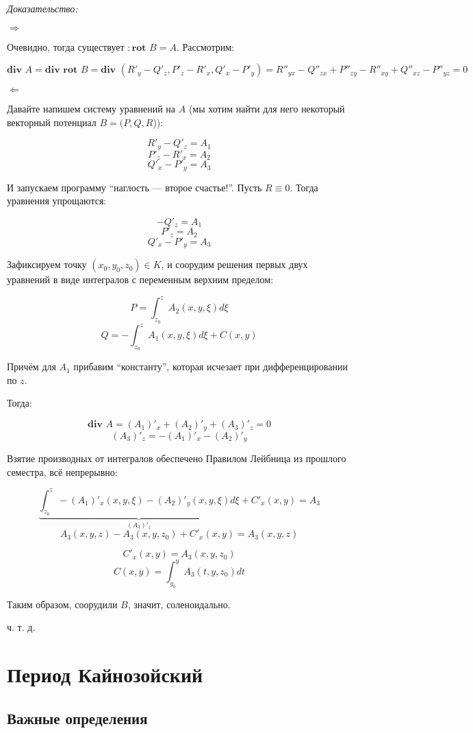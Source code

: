 \documentclass{article}
\begin{document}
\textit{Доказательство:}

$\Rightarrow$

Очевидно, тогда существует $: \textbf{rot } B = A$. Рассмотрим:

\[\textbf{div }A = \textbf{div rot }B = \textbf{div } (R'_y - Q'_z, P'_z - R'_x, Q'_x - P'_y) = R''_{yx} - Q''_{zx} + P''_{zy} - R''_{xy} + Q''_{xz} - P''_{yz} = 0\]

$\Leftarrow$ 

Давайте напишем систему уравнений на $A$ (мы хотим найти для него некоторый векторный потенциал $B = (P, Q, R$)):

\[R'_y - Q'_z = A_1\]
\[P'_z - R'_x = A_2\]
\[Q'_x - P'_y = A_3\]

И запускаем программу ``наглость --- второе счастье!''. Пусть $R \equiv 0$. Тогда уравнения упрощаются:

\[- Q'_z = A_1\]
\[P'_z= A_2\]
\[Q'_x - P'_y = A_3\]

Зафиксируем точку $(x_0, y_0, z_0) \in K$, и соорудим решения первых двух уравнений в виде интегралов с переменным верхним пределом:

\[P = \int_{z_0}^{z} A_2(x, y, \xi) d\xi\]
\[Q = - \int_{z_0}^{z} A_1(x, y, \xi) d\xi + C(x, y)\]

Причём для $A_1$ прибавим ``константу'', которая исчезает при дифференцировании по $z$.

Тогда:

\[\textbf{div } A = (A_1)'_x + (A_2)'_y + (A_3)'_z = 0\]
\[ (A_3)'_z  = - (A_1)'_x - (A_2)'_y\]

Взятие производных от интегралов обеспечено Правилом Лейбница из прошлого семестра, всё непрерывно:

\[\underbrace{\int_{z_0}^{z} -(A_1)'_x(x, y, \xi) - (A_2)'_y(x, y, \xi) d\xi}_{(A_3)'_z} + C'_x(x, y) = A_3\]
\[A_3(x, y, z) - A_3(x, y, z_0) + C'_x(x, y) = A_3(x, y, z)\]

\[C'_x(x, y) = A_3(x, y, z_0)\]
\[C(x, y) = \int_{y_0}^{y} A_3(t, y, z_0) dt\]

Таким образом, соорудили $B$, значит, соленоидально.

ч. т. д. 

\newpage

\section{Период Кайнозойский}
\subsection{Важные определения}
\end{document}
